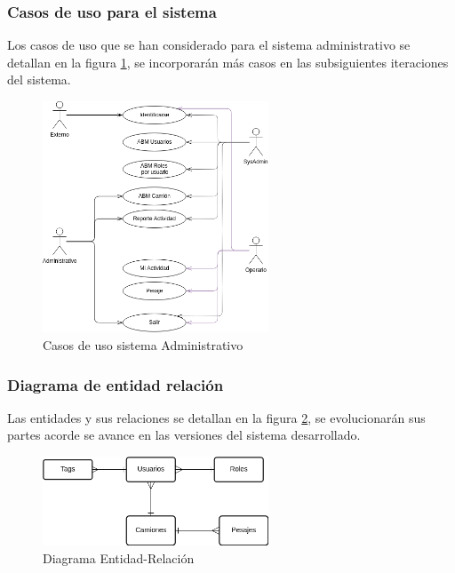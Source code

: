\subsubsection{Casos de uso para el sistema}
Los casos de uso que se han considerado para el sistema administrativo se detallan en la figura \ref{fig:usecase-admin}, se incorporarán más casos en las subsiguientes iteraciones del sistema.
\begin{figure}[h!]
	\begin{center}
		\includegraphics[width=0.6\textwidth]{images/casos-sistema-admin.png}
		\caption{Casos de uso sistema Administrativo}
		\label{fig:usecase-admin}
	\end{center}
\end{figure}

\subsubsection{Diagrama de entidad relación}
Las entidades y sus relaciones se detallan en la figura \ref{fig:er}, se evolucionarán sus partes acorde se avance en las versiones del sistema desarrollado.
\begin{figure}[h!]
	\begin{center}
		\includegraphics[width=0.6\textwidth]{images/ER-SistemaAdmin.png}
		\caption{Diagrama Entidad-Relación}
		\label{fig:er}
	\end{center}
\end{figure}

